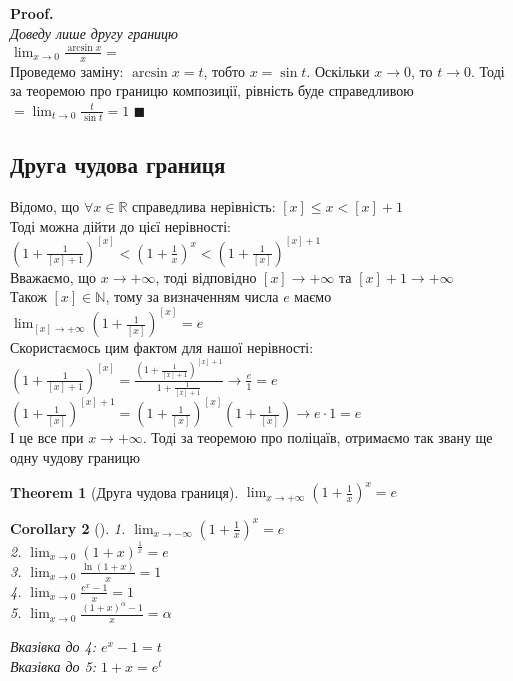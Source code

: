 \documentclass[a4paper, 14pt]{extarticle}
\def\huge{\displaystyle}
\theoremstyle{theoremdd}
\newtheorem{theorem}{Theorem}[subsection]
\theoremstyle{theoremdd}
\theoremstyle{theoremdd}
\theoremstyle{theoremdd}
\theoremstyle{theoremdd}
\theoremstyle{theoremdd}
\theoremstyle{theoremdd}
\theoremstyle{theoremdd}
\newtheorem{corollary}[theorem]{Corollary}
\newenvironment{pf}{\vspace*{-3mm} \textbf{Proof. \\}}{$\blacksquare$}
\begin{document}
\begin{pf}
\textit{Доведу лише другу границю}\\
$\huge \lim_{x \to 0} \frac{\arcsin x}{x} \boxed{=} $\\
Проведемо заміну: $\arcsin x = t$, тобто $x = \sin t$. Оскільки $x \to 0$, то $t \to 0$. Тоді за теоремою про границю композиції, рівність буде справедливою\\
$\boxed{=} \huge \lim_{t \to 0} \frac{t}{\sin t} = 1$
\end{pf}
\\

\subsection{Друга чудова границя}
Відомо, що $\forall x \in \mathbb{R}$ справедлива нерівність: $[x] \leq x < [x]+1$\\
Тоді можна дійти до цієї нерівності:\\
$\huge \left(1 + \frac{1}{[x]+1} \right)^{[x]} < \left(1 + \frac{1}{x} \right)^x < \left(1 + \frac{1}{[x]} \right)^{[x]+1}$\\
Вважаємо, що $x \to +\infty$, тоді відповідно $[x] \to + \infty$ та $[x]+1 \to + \infty$\\
Також $[x] \in \mathbb{N}$, тому за визначенням числа $e$ маємо\\
$\huge \lim_{[x] \to +\infty} \left(1 + \frac{1}{[x]} \right)^{[x]} = e$\\
Скористаємось цим фактом для нашої нерівності:\\
$\huge \left(1 + \frac{1}{[x]+1} \right)^{[x]} = \frac{\huge \left(1 + \frac{1}{[x]+1} \right)^{[x]+1}}{\huge 1 + \frac{1}{[x]+1}} \to \frac{e}{1} = e$\\
$\huge \left(1 + \frac{1}{[x]} \right)^{[x]+1} = \left(1 + \frac{1}{[x]} \right)^{[x]} \left(1 + \frac{1}{[x]} \right) \to e \cdot 1 = e$\\
І це все при $x \to +\infty$. Тоді за теоремою про поліцаїв, отримаємо так звану ще одну чудову границю
\begin{theorem}[Друга чудова границя]
$\huge \lim_{x \to +\infty} \left(1 +\frac{1}{x} \right)^x = e$
\end{theorem}

\begin{corollary}[\hspace{0.1cm}]
1. $\huge \lim_{x \to -\infty} \left(1 +\frac{1}{x} \right)^x = e$\\
2. $\huge \lim_{x \to 0} \left(1 +x \right)^{\textstyle \frac{1}{x}} = e$\\
3. $\huge \lim_{x \to 0} \frac{\ln(1+x)}{x} = 1$\\
4. $\huge \lim_{x \to 0} \frac{e^x - 1}{x} = 1$\\
5. $\huge \lim_{x \to 0} \frac{(1+x)^\alpha - 1}{x} = \alpha$
\end{corollary}
\textit{Вказівка до 4: $e^x - 1 = t$}\\
\textit{Вказівка до 5: $1 + x = e^t$}
\end{document}
